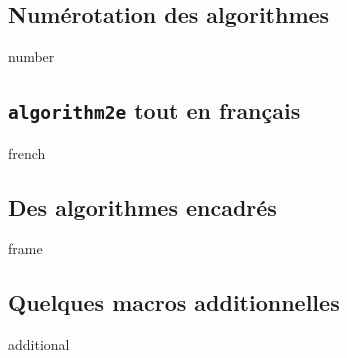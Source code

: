 \subsection{Numérotation des algorithmes}

{number}




\subsection{\texttt{algorithm2e} tout en français}

{french}




\subsection{Des algorithmes encadrés}

{frame}




\subsection{Quelques macros additionnelles} \label{algo-extra}

{additional}